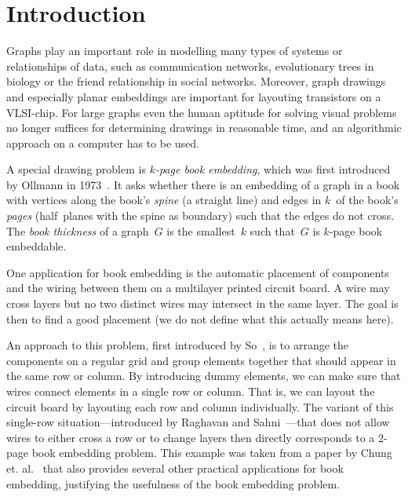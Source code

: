 \chapter{Introduction}
\label{ch:introduction}

\long{} 

Graphs play an important role in modelling many types of systems or
relationships of data, such as
communication networks, evolutionary trees in biology or the friend
relationship in social networks. Moreover, graph drawings and especially
planar embeddings are important for layouting transistors on a VLSI-chip. For large graphs even the human aptitude for solving visual 
problems no longer suffices for determining drawings in reasonable time, and an
algorithmic approach on a computer has to be used.


A special drawing problem is \emph{$k$-page book embedding}, which was first introduced by Ollmann in 1973~\cite{Ollmann73}. It asks whether there is an embedding of a graph in a book with vertices along the book's \emph{spine} (a straight line) and 
edges in $k$~of the book's \emph{pages} (half~planes with the spine as boundary) such that the 
edges do not cross. The \emph{book thickness} of a graph~$G$ is the smallest~$k$ such
that~$G$ is $k$-page book embeddable. 

One application for book embedding is the automatic placement of components 
and the wiring between them on a multilayer printed circuit board. A wire may cross
layers but no two distinct wires may intersect in the same layer. The goal is then to find a good placement (we do not define what this actually means here).

An approach to this problem, first introduced by So~\cite{So74}, is to arrange
the components on a regular grid and group elements together that should appear in the same
row or column. By introducing dummy elements, we can make sure that wires connect elements
in a single row or column. That is, we can layout the circuit board by layouting each
row and column individually. The variant of this single-row situation---introduced by Raghavan and Sahni~\cite{Raghavan83}---that does not allow wires to either cross a row or to change layers then directly corresponds
to a 2-page book embedding problem. This example was taken from a paper
by Chung et. al.~\cite{Chung87} that also provides several other practical
applications for book embedding, justifying the usefulness of the book embedding problem.

